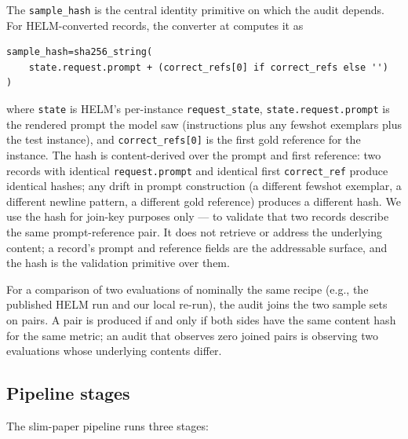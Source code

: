 \documentclass[11pt]{article}
\newcommand{\eee}{\textit{Every Eval Ever}\xspace}
\begin{document}
The \texttt{sample\_hash} is the central identity primitive on which
  the audit depends.
For HELM-converted records, the converter at
  computes it as
\begin{lstlisting}[style=python, caption={\eee{} HELM converter
  \texttt{sample\_hash} formula (excerpt; verbatim from
  \path{instance_level_adapter.py:231--233}).\label{lst:tr-sample-hash}}]
sample_hash=sha256_string(
    state.request.prompt + (correct_refs[0] if correct_refs else '')
)
\end{lstlisting}
where \texttt{state} is HELM's per-instance \texttt{request\_state},
  \texttt{state.request.prompt} is the rendered prompt the model saw
  (instructions plus any fewshot exemplars plus the test instance),
  and \texttt{correct\_refs[0]} is the first gold reference for the
  instance.
The hash is content-derived over the prompt and first reference:
  two records with identical \texttt{request.prompt} and identical
  first \texttt{correct\_ref} produce identical hashes; any drift in
  prompt construction (a different fewshot exemplar, a different
  newline pattern, a different gold reference) produces a different
  hash.
We use the hash for join-key purposes only --- to validate that two
  records describe the same prompt-reference pair.
It does not retrieve or address the underlying content; a record's
  prompt and reference fields are the addressable surface, and the
  hash is the validation primitive over them.

For a comparison of two evaluations of nominally the same recipe
  (e.g., the published HELM run and our local re-run), the audit
  joins the two sample sets on
   pairs.
A pair is produced if and only if both sides have the same content
  hash for the same metric; an audit that observes zero joined pairs
  is observing two evaluations whose underlying contents differ.

\subsection{Pipeline stages}
\label{sec:tr-pipeline-stages}

The slim-paper pipeline runs three stages:
\end{document}
